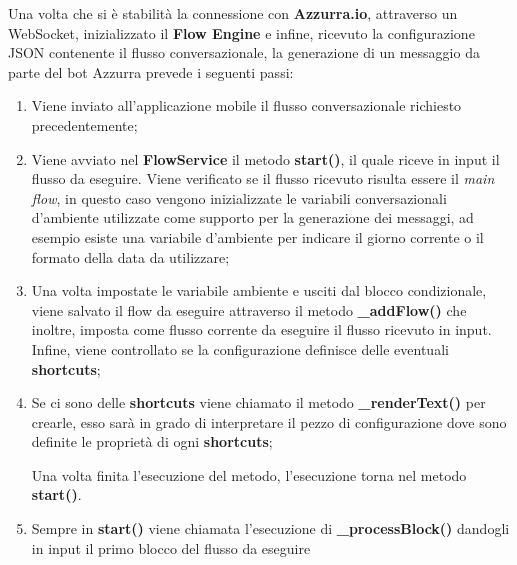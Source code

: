 Una volta che si è stabilità la connessione con \textbf{Azzurra.io}, attraverso un \gls{WebSocket}, inizializzato il \textbf{Flow Engine} e infine, ricevuto la configurazione JSON contenente il flusso conversazionale, la generazione di un messaggio da parte del bot Azzurra prevede i seguenti passi:\\
\begin{enumerate}
	\item Viene inviato all’applicazione mobile il flusso conversazionale richiesto precedentemente;
	\item Viene avviato nel \textbf{FlowService} il metodo \textbf{start()}, il quale riceve in input il flusso da eseguire. Viene verificato se il flusso ricevuto risulta essere il \emph{main flow}, in questo caso vengono inizializzate le variabili conversazionali d'ambiente utilizzate come supporto per la generazione dei messaggi, ad esempio esiste una variabile d'ambiente per indicare il giorno corrente o il formato della data da utilizzare;
	\item Una volta impostate le variabile ambiente e usciti dal blocco condizionale, viene salvato il flow da eseguire attraverso il metodo \textbf{\_addFlow()} che inoltre, imposta come flusso corrente da eseguire il flusso ricevuto in input. Infine, viene controllato se la configurazione definisce delle eventuali \textbf{shortcuts};
	\item Se ci sono delle \textbf{shortcuts} viene chiamato il metodo \textbf{\_renderText()} per crearle, esso sarà in grado di interpretare il pezzo di configurazione dove sono definite le proprietà di ogni \textbf{shortcuts};
	
	Una volta finita l'esecuzione del metodo, l'esecuzione torna nel metodo \textbf{start()}.
	\item Sempre in \textbf{start()} viene chiamata l'esecuzione di \textbf{\_processBlock()} dandogli in input il primo blocco del flusso da eseguire
	

\end{enumerate}
